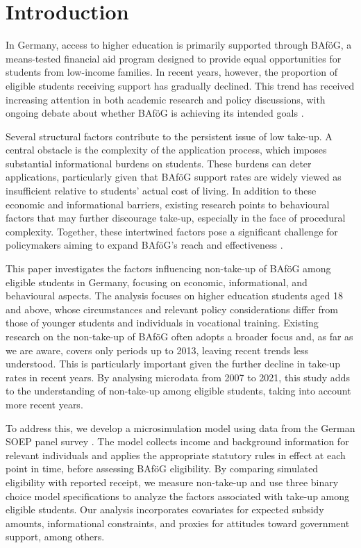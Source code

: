 \section{Introduction}

In Germany, access to higher education is primarily supported through BAföG, a means-tested financial aid program designed to provide equal opportunities for students from low-income families. In recent years, however, the proportion of eligible students receiving support has gradually declined. This trend has received increasing attention in both academic research and policy discussions, with ongoing debate about whether BAföG is achieving its intended goals \citep{gwosc_krisenbewaltigung_2022, meier_bafog_2024}.

Several structural factors contribute to the persistent issue of low take-up. 
A central obstacle is the complexity of the application process, which imposes substantial informational burdens on students. 
These burdens can deter applications, particularly given that BAföG support rates are widely viewed as insufficient relative to students’ actual cost of living. 
In addition to these economic and informational barriers, existing research points to behavioural factors that may further discourage take-up, especially in the face of procedural complexity. 
Together, these intertwined factors pose a significant challenge for policymakers aiming to expand BAföG’s reach and effectiveness \citep{staack_von_2017, bhargava_psychological_2015, bolland_information_nodate}.

This paper investigates the factors influencing non-take-up of BAföG among eligible students in Germany, focusing on economic, informational, and behavioural aspects. 
The analysis focuses on higher education students aged 18 and above, whose circumstances and relevant policy considerations differ from those of younger students and individuals in vocational training.
Existing research on the non-take-up of BAföG often adopts a broader focus and, as far as we are aware, covers only periods up to 2013, leaving recent trends less understood.
This is particularly important given the further decline in take-up rates in recent years. 
By analysing microdata from 2007 to 2021, this study adds to the understanding of non-take-up among eligible students, taking into account more recent years.


To address this, we develop a microsimulation model using data from the German SOEP panel survey \citep{soepcore_v39}. 
The model collects income and background information for relevant individuals and applies the appropriate statutory rules in effect at each point in time, before assessing BAföG eligibility. 
By comparing simulated eligibility with reported receipt, we measure non-take-up and use three binary choice model specifications to analyze the factors associated with take-up among eligible students. 
Our analysis incorporates covariates for expected subsidy amounts, informational constraints, and proxies for attitudes toward government support, among others. 


